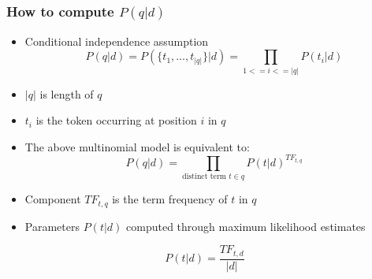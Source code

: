 \documentclass[svgnames]{beamer}
\begin{document}
\begin{frame} \frametitle{How to compute $P(q|d)$}
  
  \begin{block}{}
  \scriptsize
    \begin{itemize}
    \item Conditional independence assumption
	\begin{equation*}
	P(q|d) = P(\{t_1,\ldots,t_{|q|}\}|d) = \prod_{1<=i<=|q|} P(t_i|d)
	\end{equation*}
    \item $|q|$ is length of $q$
    \item $t_i$ is the token occurring at position $i$ in $q$
    \end{itemize}
  \end{block}

  \begin{block}{}
    \scriptsize
    \begin{itemize}
    \item The above multinomial model is equivalent to:
	\begin{equation*}
	P(q|d) = \prod_{\text{distinct term~} t \in q} P(t|d)^{TF_{t,q}}
	\end{equation*}
	\item Component $TF_{t,q}$ is the term frequency of $t$ in $q$
    \item Parameters $P(t|d)$ computed through maximum likelihood estimates
	\end{itemize}
		\begin{equation*}
		P(t|d) = \frac{TF_{t,d}}{|d|}
		\end{equation*}
  \end{block}

\end{frame}
\end{document}
